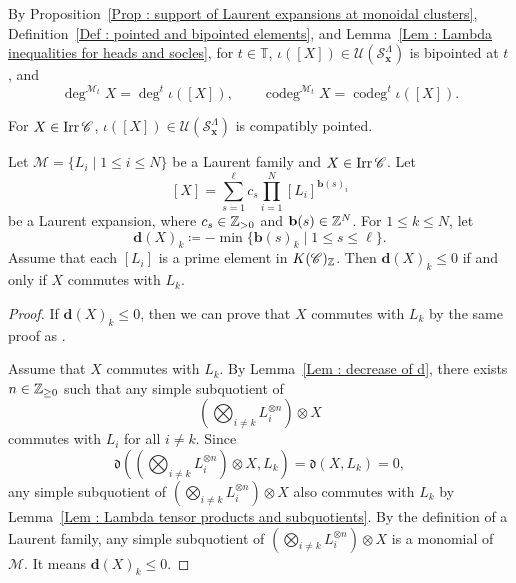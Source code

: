 By Proposition~\ref{Prop : support of Laurent expansions at monoidal clusters},
Definition~\ref{Def : pointed and bipointed elements}, and
Lemma~\ref{Lem : Lambda inequalities for heads and socles},
for $t \in \mathbb{T}$,
$\iota([X]) \in \mathcal{U}(\mathcal{S}_{\mathbf{x}}^{\Lambda})$
is bipointed at $t$, and
\[
\deg^{\mathcal{M}_t}X = \deg^t\iota([X]),
\qquad
\operatorname{codeg}^{\mathcal{M}_t}X
= \operatorname{codeg}^t\iota([X]).
\]

\begin{Prop}
\label{Prop : compatible pointedness of simple modules}
For $X \in \mathop{\mathrm{Irr}}\nolimits\mathscr{C}$,
$\iota([X]) \in \mathcal{U}(\mathcal{S}_{\mathbf{x}}^{\Lambda})$
is compatibly pointed.
\end{Prop}

\begin{Prop}
\label{Prop : denominators and commutativity for Laurent families}
Let $\mathcal{M} = \{L_i \mid 1 \leq i \leq N\}$
be a Laurent family and $X \in \mathop{\mathrm{Irr}}\nolimits\mathscr{C}$.
Let
\[
[X] = \sum_{s=1}^{\ell}c_s\prod_{i=1}^N[L_i]^{\mathbf{b}(s)_i}
\]
be a Laurent expansion, where $c_s \in \mathbb{Z}_{>0}$
and $\mathbf{b}(s) \in \mathbb{Z}^N$.
For $1 \leq k \leq N$, let
\[
\mathbf{d}(X)_k
\coloneq -\min\{\mathbf{b}(s)_k \mid 1 \leq s \leq \ell\}.
\]
Assume that each $[L_i]$ is a prime element in $K(\mathscr{C})_{\mathbb{Z}}$.
Then $\mathbf{d}(X)_k \leq 0$ if and only if $X$ commutes with $L_k$.
\end{Prop}

\begin{proof}
If $\mathbf{d}(X)_k \leq 0$, then we can prove that
$X$ commutes with $L_k$ by the same proof as
\cite[Lemma 4.2]{KK19}.

Assume that $X$ commutes with $L_k$.
By Lemma~\ref{Lem : decrease of d}, there exists $n \in \mathbb{Z}_{\geq 0}$
such that any simple subquotient of
\[
\left(\bigotimes_{i\ne k}L_i^{\otimes n}\right)\otimes X
\]
commutes with $L_i$ for all $i \ne k$.
Since
\[
\mathfrak{d}\left(
\left(\bigotimes_{i\ne k}L_i^{\otimes n}\right)\otimes X, L_k
\right)
= \mathfrak{d}(X, L_k) = 0,
\]
any simple subquotient of
$\left(\bigotimes_{i\ne k}L_i^{\otimes n}\right)\otimes X$
also commutes with $L_k$
by Lemma~\ref{Lem : Lambda tensor products and subquotients}.
By the definition of a Laurent family, any simple subquotient of
$\left(\bigotimes_{i\ne k}L_i^{\otimes n}\right)\otimes X$
is a monomial of $\mathcal{M}$.
It means $\mathbf{d}(X)_k \leq 0$.
\end{proof}

